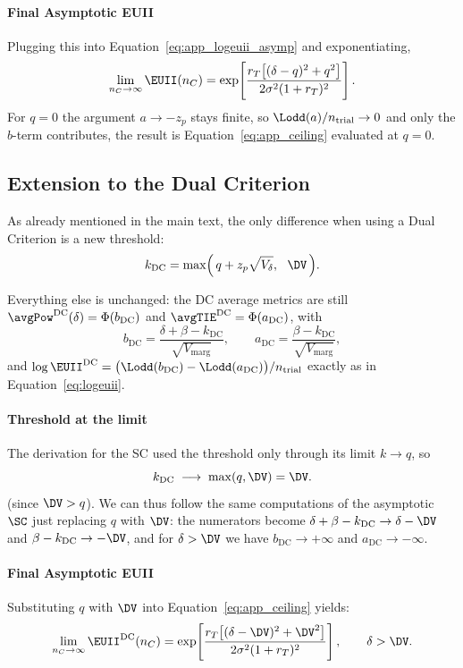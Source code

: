\paragraph{Final Asymptotic EUII}
Plugging this into Equation~\eqref{eq:app_logeuii_asymp} and exponentiating,
\begin{equation}\label{eq:app_ceiling}
  \lim_{n_C\to\infty}\EUII(n_C)
  = \exp\!\left[\frac{r_T\big[(\delta-q)^2+q^2\big]}{2\sigma^2(1+r_T)^2}\right].
\end{equation}
For $q=0$ the argument $a\to-z_p$ stays finite, so $\Lodd(a)/n_{\mathrm{trial}}\to0$ and only the $b$-term contributes, the result is Equation~\eqref{eq:app_ceiling} evaluated at $q=0$.


\subsection{Extension to the Dual Criterion}
As already mentioned in the main text, the only difference when using a Dual Criterion is a new threshold:
\begin{equation}\label{eq:app_kdc}
  k_{\mathrm{DC}} = \max\!\Big(\,q + z_p\sqrt{V_\delta},\ \ \DV\,\Big).
\end{equation}

Everything else is unchanged: the DC average metrics are still $\avgPow^{\mathrm{DC}}(\delta) = \Phi(b_{\mathrm{DC}})$ and $\avgTIE^{\mathrm{DC}} = \Phi(a_{\mathrm{DC}})$, with
\[
  b_{\mathrm{DC}} = \frac{\delta+\beta-k_{\mathrm{DC}}}{\sqrt{V_{\mathrm{marg}}}},
  \qquad
  a_{\mathrm{DC}} = \frac{\beta-k_{\mathrm{DC}}}{\sqrt{V_{\mathrm{marg}}}},
\]
and $\log\EUII^{\mathrm{DC}} = \big(\Lodd(b_{\mathrm{DC}})-\Lodd(a_{\mathrm{DC}})\big)/n_{\mathrm{trial}}$ exactly as in Equation~\eqref{eq:logeuii}.

\paragraph{Threshold at the limit}
The derivation for the SC used the threshold only through its limit $k\to q$, so
\[
  k_{\mathrm{DC}} \;\longrightarrow\; \max(q,\DV) = \DV.
\]
(since $\DV > q$). We can thus follow the same computations of the asymptotic $\SC$ just replacing $q$ with $\DV$: the numerators become $\delta+\beta-k_{\mathrm{DC}}\to\delta-\DV$ and $\beta-k_{\mathrm{DC}}\to-\DV$, and for $\delta>\DV$ we have $b_{\mathrm{DC}}\to+\infty$ and $a_{\mathrm{DC}}\to-\infty$.


\paragraph{Final Asymptotic EUII}
Substituting $q$ with $\DV$ into Equation~\eqref{eq:app_ceiling} yields:
\begin{equation}\label{eq:app_ceiling_dc}
  \lim_{n_C\to\infty}\EUII^{\mathrm{DC}}(n_C)
  = \exp\!\left[\frac{r_T\big[(\delta-\DV)^2+\DV^2\big]}{2\sigma^2(1+r_T)^2}\right],
  \qquad \delta > \DV .
\end{equation}
